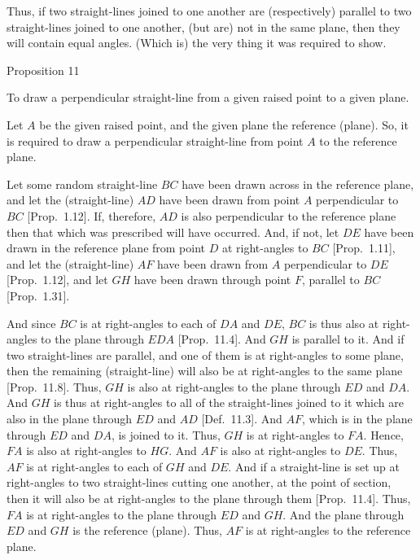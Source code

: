 Thus, if two straight-lines joined to one another
are (respectively) parallel to two straight-lines joined to one another, (but are) not in the same
plane, then they will contain equal angles. (Which is) the very thing it
was required to show.


\begin{center}
{\large Proposition 11}
\end{center}

To draw a perpendicular straight-line from a
given raised point to a given plane.

\epsfysize=2.5in
\centerline{}

Let $A$ be the given raised point, and the given plane the reference (plane).
So, it is required to draw a perpendicular straight-line from point $A$
to the reference plane.

Let some random straight-line $BC$ have been drawn across in the reference plane, and let the  (straight-line) $AD$ have been
drawn from point $A$ perpendicular to $BC$ [Prop.~1.12].
If, therefore, $AD$ is also perpendicular to the reference plane then that which
was prescribed will have occurred. And, if not, let $DE$ have been
drawn in the reference plane from point $D$  at right-angles to $BC$ [Prop.~1.11], and let the (straight-line) $AF$
have been drawn from $A$ perpendicular to $DE$ [Prop.~1.12],
and let $GH$ have been drawn through point $F$, parallel to $BC$ [Prop.~1.31].

And since $BC$ is at right-angles to each of $DA$ and $DE$, $BC$ is
thus also at right-angles to the plane through $EDA$ [Prop.~11.4]. And $GH$ is parallel to it. And if two 
straight-lines are parallel, and one of them is at right-angles to some plane, then the
remaining (straight-line) will also be at right-angles to the same plane
[Prop.~11.8]. Thus, $GH$ is also
at right-angles to the plane through $ED$ and $DA$. And $GH$ is thus
at right-angles to all of the straight-lines joined to it which are also
in the plane through $ED$ and $AD$ [Def.~11.3].
And $AF$, which is in the plane through $ED$ and $DA$, is joined to it.
Thus, $GH$ is at right-angles to $FA$. Hence, $FA$ is also
at right-angles to $HG$. And $AF$ is also at right-angles to $DE$.
Thus, $AF$ is at right-angles to each of $GH$ and $DE$. And if a straight-line is set up at right-angles to two straight-lines cutting one another, at the
point of section, then it will also be at right-angles to the plane through them
[Prop.~11.4]. Thus, $FA$ is at right-angles to the
plane through $ED$ and $GH$. And the plane through $ED$ and
$GH$ is the reference (plane). Thus, $AF$ is at right-angles to
the reference plane.

